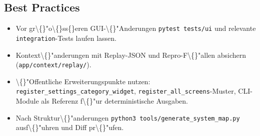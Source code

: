 \subsection{Best Practices}

\begin{itemize}
\item Vor gr\textbackslash\{\}"o\textbackslash\{\}ss\{\}eren GUI-\textbackslash\{\}"Anderungen \texttt{pytest tests/ui} und relevante \texttt{integration}-Tests laufen lassen.
\item Kontext\textbackslash\{\}"anderungen mit Replay-JSON und Repro-F\textbackslash\{\}"allen absichern (\texttt{app/context/replay/}).
\item \textbackslash\{\}"Offentliche Erweiterungspunkte nutzen: \texttt{register\_settings\_category\_widget}, \texttt{register\_all\_screens}-Muster, CLI-Module als Referenz f\textbackslash\{\}"ur deterministische Ausgaben.
\item Nach Struktur\textbackslash\{\}"anderungen \texttt{python3 tools/generate\_system\_map.py} ausf\textbackslash\{\}"uhren und Diff pr\textbackslash\{\}"ufen.
\end{itemize}
